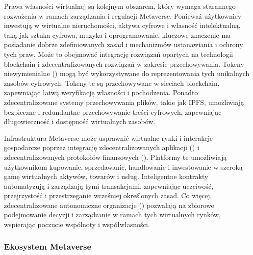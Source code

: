 Prawa własności wirtualnej są kolejnym obszarem, który wymaga starannego rozważenia w ramach zarządzania i regulacji Metaverse. Ponieważ użytkownicy inwestują w wirtualne nieruchomości, aktywa cyfrowe i własność intelektualną, taką jak sztuka cyfrowa, muzyka i oprogramowanie, kluczowe znaczenie ma posiadanie dobrze zdefiniowanych zasad i mechanizmów ustanawiania i ochrony tych praw. Może to obejmować integrację rozwiązań opartych na technologii blockchain i zdecentralizowanych rozwiązań w zakresie przechowywania. Tokeny niewymienialne  () mogą być wykorzystywane do reprezentowania tych unikalnych zasobów cyfrowych. Tokeny te są przechowywane w sieciach blockchain, zapewniając łatwą weryfikację własności i pochodzenia. Ponadto zdecentralizowane systemy przechowywania plików, takie jak IPFS, umożliwiają bezpieczne i redundantne przechowywanie treści cyfrowych, zapewniając długowieczność i dostępność wirtualnych zasobów\cite{metaverseInfrastructureIEEE}.

Infrastruktura Metaverse może usprawnić wirtualne rynki i interakcje gospodarcze poprzez integrację zdecentralizowanych aplikacji  () i zdecentralizowanych protokołów finansowych  (). Platformy te umożliwiają użytkownikom kupowanie, sprzedawanie, handlowanie i inwestowanie w szeroką gamę wirtualnych aktywów, towarów i usług. Inteligentne kontrakty automatyzują i zarządzają tymi transakcjami, zapewniając uczciwość, przejrzystość i przestrzeganie wcześniej określonych zasad. Co więcej, zdecentralizowane autonomiczne organizacje  () pozwalają na zbiorowe podejmowanie decyzji i zarządzanie w ramach tych wirtualnych rynków, wspierając poczucie wspólnoty i współwłasności\cite{metaverseInfrastructureIEEE}.

\subsubsection{Ekosystem Metaverse}

